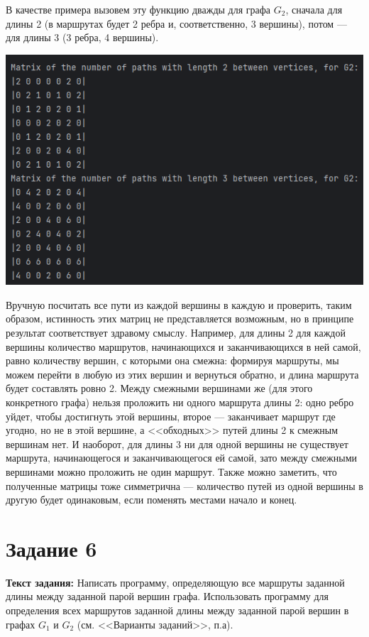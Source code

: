 \documentclass[12pt]{article}
\begin{document}
	В качестве примера вызовем эту функцию дважды для графа $G_2$, сначала для длины 2 (в маршрутах будет 2 ребра и, соответственно, 3 вершины), потом --- для длины 3 (3 ребра, 4 вершины).
	
	
	{\centering
	\includegraphics[width=150mm]{images/ex5.png} 
	}
	
	Вручную посчитать все пути из каждой вершины в каждую и проверить, таким образом, истинность этих матриц не представляется возможным, но в принципе результат соответствует здравому смыслу. Например, для длины 2 для каждой вершины количество маршрутов, начинающихся и заканчивающихся в ней самой, равно количеству вершин, с которыми она смежна: формируя маршруты, мы можем перейти в любую из этих вершин и вернуться обратно, и длина маршрута будет составлять ровно 2. Между смежными вершинами же (для этого конкретного графа) нельзя проложить ни одного маршрута длины 2: одно ребро уйдет, чтобы достигнуть этой вершины, второе --- заканчивает маршрут где угодно, но не в этой вершине, а <<обходных>> путей длины 2 к смежным вершинам нет. И наоборот, для длины 3 ни для одной вершины не существует маршрута, начинающегося и заканчивающегося ей самой, зато между смежными вершинами можно проложить не один маршрут. Также можно заметить, что полученные матрицы тоже симметрична --- количество путей из одной вершины в другую будет одинаковым, если поменять местами начало и конец.
	
	\section{Задание 6}
	\label{task6}
		
	{\bf Текст задания:} Написать программу, определяющую все маршруты заданной длины между заданной парой вершин графа. Использовать программу для определения всех маршрутов заданной длины между заданной парой вершин в графах $G_1$ и $G_2$ (см. <<Варианты заданий>>, п.а).
	
\end{document}
